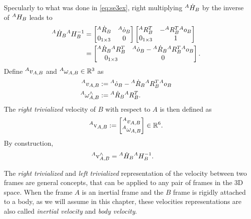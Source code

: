\noindent 
Specularly to what was done in \eqref{eq:se3ex}, 
right multiplying $\hspace{0em}^A {\dot H}_B$ by the inverse of
$\hspace{0em}^A H_B$ leads to
\begin{align}
  \hspace{0em}^A {\dot H}_B  \hspace{0em}^A H_B^{-1} 
& =  
  \begin{bmatrix}
    \hspace{0em}^{A} \dot{R}_{B}   & \hspace{0em}^A {\dot o}_B \\
     0_{1\times3} & 0
  \end{bmatrix}
  \begin{bmatrix} 
    \hspace{0em}^A R_B^T & -\hspace{0em}^A R_B^T \hspace{0em}^A o_B \\
    0_{1\times3} & 1
  \end{bmatrix}
\notag\\
& =
  \begin{bmatrix}
     \hspace{0em}^{A} \dot{R}_{B}  \hspace{0em}^A R_B^T & 
          \hspace{0em}^A {\dot o}_B - \hspace{0em}^{A} \dot{R}_{B} \hspace{0em}^A R_B^T \hspace{0em}^A o_B \\
     0_{1\times3} & 0
  \end{bmatrix} .
\end{align}
Define
$\hspace{0em}^A v_{A,B}$ and $\hspace{0em}^A \omega_{A,B} \in \mathbb{R}^3$ 
as
\begin{align}
\label{eq:AvAB}
  \hspace{0em}^A v_{A,B} 
& := 
  \hspace{0em}^A {\dot o}_B - \hspace{0em}^{A} \dot{R}_{B} \hspace{0em}^A R_B^T \hspace{0em}^A o_B
\\
\label{eq:AwAB}
  \hspace{0em}^A \omega^{\wedge}_{A,B} 
& := 
  \hspace{0em}^{A} \dot{R}_{B}  \hspace{0em}^A R_B^T.
\end{align}
The \emph{right trivialized} velocity of $B$ with respect to $A$ is then defined as
\begin{equation}
\hspace{0em}^A {\rm v}_{A,B} := 
\begin{bmatrix}
\hspace{0em}^{A} v_{A,B} \\
\hspace{0em}^{A} \omega_{A,B}
\end{bmatrix} 
\in \mathbb{R}^6 .
\end{equation}
By construction, 
\begin{align} \label{eq:defAVAB}
  \hspace{0em}^A {\rm v}^{\wedge}_{A,B} 
& = 
  \hspace{0em}^{A} \dot{H}_{B} \hspace{0em}^{A} H_{B}^{-1} .
\end{align}

The \emph{right trivialized} and \emph{left trivialized} representation of the velocity between two frames are general concepts, that can be applied to any pair of frames in the 3D space. When the frame $A$ is an inertial frame and the $B$ frame is rigidly attached to a body, as we will assume in this chapter, these velocities representations are also called \emph{inertial velocity} and \emph{body velocity}.

